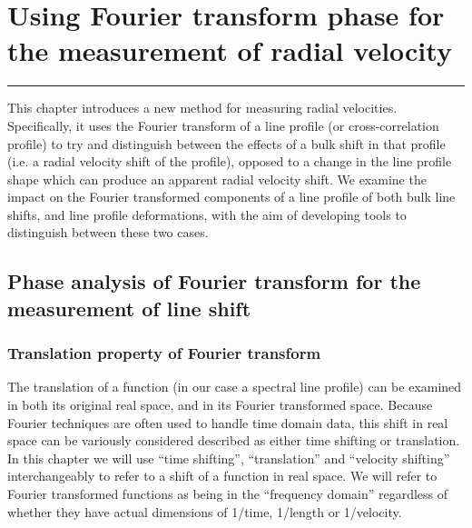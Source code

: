 \chapter{Using Fourier transform phase for the measurement of radial velocity}
\label{\thechapter}
\label{ch:Methods}


\rule{\textwidth}{1.6pt}
\minitoc
\clearpage



This chapter introduces a new method for measuring radial velocities. Specifically, it uses the Fourier transform
of a line profile (or cross-correlation profile) to try and distinguish between the effects of a bulk shift in that profile
(i.e. a radial velocity shift of the profile), opposed to a change in the line profile shape which can produce an
apparent radial velocity shift. We examine the impact on the Fourier transformed components of a line profile of both bulk line shifts, and line profile deformations, with the aim of developing tools to distinguish between these two cases.



\section{Phase analysis of Fourier transform for the measurement of line shift}
\label{\thesection}
\label{ch:FT_line_shift}


\subsection{Translation property of Fourier transform}

The translation of a function (in our case a spectral line profile) can be examined in both its original real
space, and in its Fourier transformed space. Because Fourier techniques are often used to handle time domain data,
this shift in real space can be variously considered described as either time shifting or translation. In this chapter 
we will use ``time shifting'', ``translation'' and ``velocity shifting'' interchangeably to refer to a shift of a function
in real space. We will refer to Fourier transformed functions as being in the ``frequency domain'' regardless of whether they have actual dimensions of 1/time, 1/length or 1/velocity.

